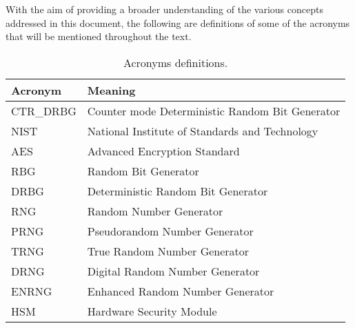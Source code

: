 \noindent
With the aim of providing a broader understanding of the various concepts addressed in this document, the following are definitions of some of the acronyms that will be mentioned throughout the text.

\begin{table}[h!]
\centering
\begin{tabular}{@{}ll@{}}
\toprule
\textbf{Acronym} & \textbf{Meaning} \\ \midrule
CTR\_DRBG & Counter mode Deterministic Random Bit Generator \\
NIST & National Institute of Standards and Technology \\
AES & Advanced Encryption Standard \\
RBG & Random Bit Generator \\
DRBG & Deterministic Random Bit Generator \\
RNG & Random Number Generator \\
PRNG & Pseudorandom Number Generator \\ 
TRNG & True Random Number Generator \\
DRNG & Digital Random Number Generator \\
ENRNG & Enhanced Random Number Generator \\
HSM & Hardware Security Module \\ \bottomrule
\end{tabular}
\caption{Acronyms definitions.}
\label{tab:acronyms}
\end{table}

